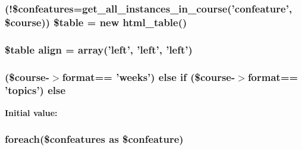 \hypertarget{index_8php_a96b34b1df0434e68adafe20938e2864a}{
\subsubsection[{\$table}]{ (!\$confeatures=get\-\_\-all\-\_\-instances\-\_\-in\-\_\-course('confeature', \$course)) \$table = new html\-\_\-table()}}\label{index_8php_a96b34b1df0434e68adafe20938e2864a}
\hypertarget{index_8php_a8157eb76abbafb202f62b1c82d099159}{
\subsubsection[{align}]{\setlength{\rightskip}{0pt plus 5cm}\$table align = array('left', 'left', 'left')}}\label{index_8php_a8157eb76abbafb202f62b1c82d099159}
\hypertarget{index_8php_a0799edd8facb2c34db7e8afb18dad21b}{
\subsubsection[{else}]{ (\$course-\/$>$format== 'weeks') else {\bf if} (\$course-\/$>$format== 'topics') else}}\label{index_8php_a0799edd8facb2c34db7e8afb18dad21b}
{\bfseries Initial value\-:}
\hypertarget{index_8php_a1dfad6a7acd4569718f5bf04239e3e28}{
\subsubsection[{foreach}]{\setlength{\rightskip}{0pt plus 5cm}foreach(\$confeatures as \$confeature)}}\label{index_8php_a1dfad6a7acd4569718f5bf04239e3e28}
